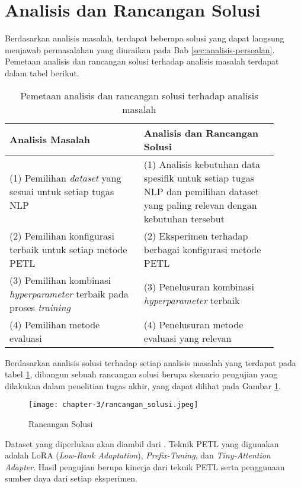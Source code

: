 \section{Analisis dan Rancangan Solusi}

Berdasarkan analisis masalah, terdapat beberapa solusi yang dapat langsung menjawab permasalahan yang diuraikan pada Bab \ref{sec:analisis-persoalan}. Pemetaan analisis dan rancangan solusi terhadap analisis masalah terdapat dalam tabel berikut.

\begin{table}[h!]
    \centering
    \begin{tabular}{|m{0.45\linewidth}|m{0.45\linewidth}|}
    \hline
    \rowcolor{black!10}
    \textbf{Analisis Masalah} & \textbf{Analisis dan Rancangan Solusi} \\ \hline
    (1) Pemilihan \textit{dataset} yang sesuai untuk setiap tugas NLP & (1) Analisis kebutuhan data spesifik untuk setiap tugas NLP dan pemilihan dataset yang paling relevan dengan kebutuhan tersebut\\ \hline
    (2) Pemilihan konfigurasi terbaik untuk setiap metode PETL & (2) Eksperimen terhadap berbagai konfigurasi metode PETL \\ \hline
    (3) Pemilihan kombinasi \textit{hyperparameter} terbaik pada proses \textit{training} & (3) Penelusuran kombinasi \textit{hyperparameter} terbaik\\ \hline
    (4) Pemilihan metode evaluasi & (4) Penelusuran metode evaluasi yang relevan \\ \hline
    \end{tabular}
\caption{Pemetaan analisis dan rancangan solusi terhadap analisis masalah}
\label{table:pemetaan-masalah-solusi}
\end{table}

Berdasarkan analisis solusi terhadap setiap analisis masalah yang terdapat pada tabel \ref{table:pemetaan-masalah-solusi}, dibangun sebuah rancangan solusi berupa skenario pengujian yang dilakukan dalam penelitian tugas akhir, yang dapat dilihat pada Gambar \ref{fig:rancangan-solusi}.

\begin{figure}[ht]
    \centering
    \texttt{[image: chapter-3/rancangan\_solusi.jpeg]}
    \caption{Rancangan Solusi}
    \label{fig:rancangan-solusi}
\end{figure}

Dataset yang diperlukan akan diambil dari \cite{nusacatalogue}. Teknik PETL yang digunakan adalah LoRA (\textit{Low-Rank Adaptation}), \textit{Prefix-Tuning}, dan \textit{Tiny-Attention Adapter}. Hasil pengujian berupa kinerja dari teknik PETL serta penggunaan sumber daya dari setiap eksperimen.